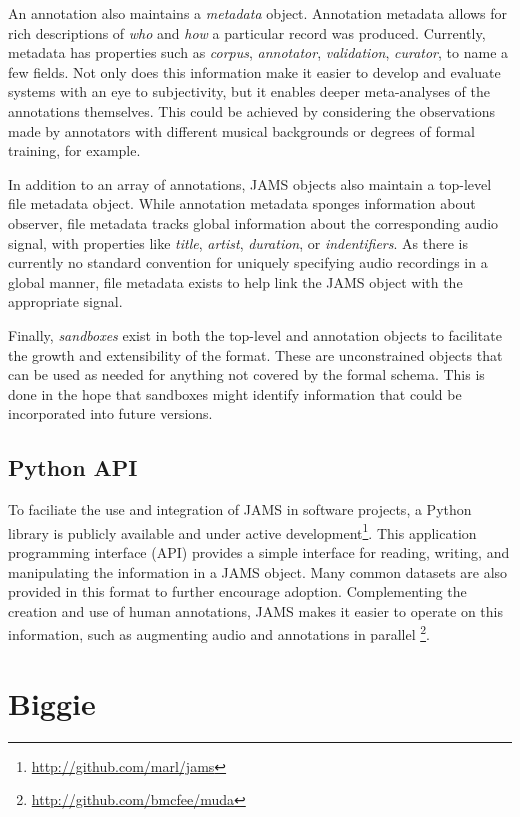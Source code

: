 An annotation also maintains a \emph{metadata} object.
Annotation metadata allows for rich descriptions of \emph{who} and \emph{how} a particular record was produced.
Currently, metadata has properties such as \emph{corpus}, \emph{annotator}, \emph{validation}, \emph{curator}, to name a few fields.
Not only does this information make it easier to develop and evaluate systems with an eye to subjectivity, but it enables deeper meta-analyses of the annotations themselves.
This could be achieved by considering the observations made by annotators with different musical backgrounds or degrees of formal training, for example.

In addition to an array of annotations, JAMS objects also maintain a top-level file metadata object.
While annotation metadata sponges information about observer, file metadata tracks global information about the corresponding audio signal, with properties like \emph{title}, \emph{artist}, \emph{duration}, or \emph{indentifiers}.
As there is currently no standard convention for uniquely specifying audio recordings in a global manner, file metadata exists to help link the JAMS object with the appropriate signal.

Finally, \emph{sandboxes} exist in both the top-level and annotation objects to facilitate the growth and extensibility of the format.
These are unconstrained objects that can be used as needed for anything not covered by the formal schema.
This is done in the hope that sandboxes might identify information that could be incorporated into future versions.


\subsection{Python API}
\label{subsec:jams_tools}

To faciliate the use and integration of JAMS in software projects, a Python library is publicly available and under active development\footnote{\url{http://github.com/marl/jams}}.
This application programming interface (API) provides a simple interface for reading, writing, and manipulating the information in a JAMS object.
Many common datasets are also provided in this format to further encourage adoption.
Complementing the creation and use of human annotations, JAMS makes it easier to operate on this information, such as augmenting audio and annotations in parallel \footnote{\url{http://github.com/bmcfee/muda}}.


\section{Biggie}
\label{sec:biggie}

